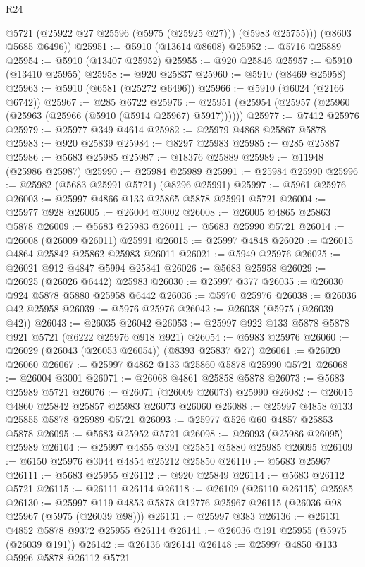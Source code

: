 \begin{lexlean}{R24}
\begin{coremodule}
          @5721
          (@25922 @27 @25596 (@5975 (@25925 @27)))
          (@5983 @25755)))
      (@8603 @5685 @6496))
@25951 := @5910 (@13614 @8608)
@25952 := @5716 @25889
@25954 := @5910 (@13407 @25952)
@25955 := @920 @25846
@25957 := @5910 (@13410 @25955)
@25958 := @920 @25837
@25960 := @5910 (@8469 @25958)
@25963 := @5910 (@6581 (@25272 @6496))
@25966 := @5910 (@6024 (@2166 @6742))
@25967 := @285 @6722
@25976 := @25951 (@25954 (@25957 (@25960 (@25963 (@25966 (@5910 (@5914 @25967) @5917))))))
@25977 := @7412 @25976
@25979 := @25977 @349 @4614
@25982 := @25979 @4868 @25867 @5878
@25983 := @920 @25839
@25984 := @8297 @25983
@25985 := @285 @25887
@25986 := @5683 @25985
@25987 := @18376 @25889
@25989 := @11948 (@25986 @25987)
@25990 := @25984 @25989
@25991 := @25984 @25990
@25996 := @25982 (@5683 @25991 @5721) (@8296 @25991)
@25997 := @5961 @25976
@26003 := @25997 @4866 @133 @25865 @5878 @25991 @5721
@26004 := @25977 @928
@26005 := @26004 @3002
@26008 := @26005 @4865 @25863 @5878
@26009 := @5683 @25983
@26011 := @5683 @25990 @5721
@26014 := @26008 (@26009 @26011) @25991
@26015 := @25997 @4848
@26020 := @26015 @4864 @25842 @25862 @25983 @26011
@26021 := @5949 @25976
@26025 := @26021 @912 @4847 @5994 @25841
@26026 := @5683 @25958
@26029 := @26025 (@26026 @6442) @25983
@26030 := @25997 @377
@26035 := @26030 @924 @5878 @5880 @25958 @6442
@26036 := @5970 @25976
@26038 := @26036 @42 @25958
@26039 := @5976 @25976
@26042 := @26038 (@5975 (@26039 @42))
@26043 := @26035 @26042
@26053 := @25997 @922 @133 @5878 @5878 @921 @5721 (@6222 @25976 @918 @921)
@26054 := @5983 @25976
@26060 := @26029 (@26043 (@26053 @26054)) (@8393 @25837 @27)
@26061 := @26020 @26060
@26067 := @25997 @4862 @133 @25860 @5878 @25990 @5721
@26068 := @26004 @3001
@26071 := @26068 @4861 @25858 @5878
@26073 := @5683 @25989 @5721
@26076 := @26071 (@26009 @26073) @25990
@26082 := @26015 @4860 @25842 @25857 @25983 @26073 @26060
@26088 := @25997 @4858 @133 @25855 @5878 @25989 @5721
@26093 := @25977 @526 @60 @4857 @25853 @5878
@26095 := @5683 @25952 @5721
@26098 := @26093 (@25986 @26095) @25989
@26104 := @25997 @4855 @391 @25851 @5880 @25985 @26095
@26109 := @6150 @25976 @3044 @4854 @25212 @25850
@26110 := @5683 @25967
@26111 := @5683 @25955
@26112 := @920 @25849
@26114 := @5683 @26112 @5721
@26115 := @26111 @26114
@26118 := @26109 (@26110 @26115) @25985
@26130 := @25997 @119 @4853 @5878 @12776 @25967 @26115 (@26036 @98 @25967 (@5975 (@26039 @98)))
@26131 := @25997 @383
@26136 := @26131 @4852 @5878 @9372 @25955 @26114
@26141 := @26036 @191 @25955 (@5975 (@26039 @191))
@26142 := @26136 @26141
@26148 := @25997 @4850 @133 @5996 @5878 @26112 @5721

\end{coremodule}
\end{lexlean}
